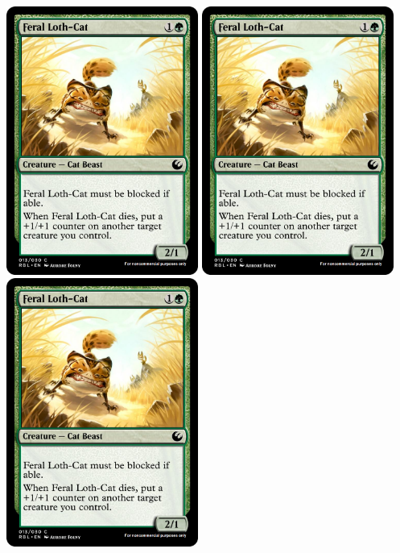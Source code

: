 \documentclass[a4paper,12pt]{article}
\begin{document}
\includegraphics[width=63mm,height=88mm]{images/Feral_Loth-Cat.png}
\includegraphics[width=63mm,height=88mm]{images/Feral_Loth-Cat.png}
\includegraphics[width=63mm,height=88mm]{images/Feral_Loth-Cat.png}

\newpage
\end{document}
